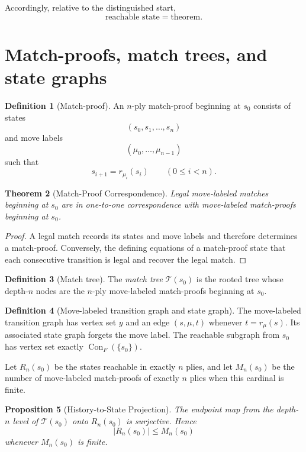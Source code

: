 \documentclass[11pt]{article}
\newtheorem{theorem}{Theorem}[section]
\newtheorem{proposition}[theorem]{Proposition}
\theoremstyle{definition}
\newtheorem{definition}[theorem]{Definition}
\theoremstyle{remark}
\newcommand{\Conseq}{\operatorname{Con}}
\begin{document}
Accordingly, relative to the distinguished start,
\[
\boxed{\text{reachable state}=\text{theorem}.}
\]

\section{Match-proofs, match trees, and state graphs}

\begin{definition}[Match-proof]
An $n$-ply match-proof beginning at $s_0$ consists of states
\[
(s_0,s_1,\ldots,s_n)
\]
and move labels
\[
(\mu_0,\ldots,\mu_{n-1})
\]
such that
\[
s_{i+1}=r_{\mu_i}(s_i)
\qquad(0\le i<n).
\]
\end{definition}

\begin{theorem}[Match-Proof Correspondence]
Legal move-labeled matches beginning at $s_0$ are in one-to-one correspondence with move-labeled match-proofs beginning at $s_0$.
\end{theorem}

\begin{proof}
A legal match records its states and move labels and therefore determines a match-proof.  Conversely, the defining equations of a match-proof state that each consecutive transition is legal and recover the legal match.
\end{proof}

\begin{definition}[Match tree]
The \emph{match tree} $\mathcal T(s_0)$ is the rooted tree whose depth-$n$ nodes are the $n$-ply move-labeled match-proofs beginning at $s_0$.
\end{definition}

\begin{definition}[Move-labeled transition graph and state graph]
The move-labeled transition graph has vertex set $y$ and an edge $(s,\mu,t)$ whenever $t=r_\mu(s)$.  Its associated state graph forgets the move label.  The reachable subgraph from $s_0$ has vertex set exactly $\Conseq_F(\{s_0\})$.
\end{definition}

Let $R_n(s_0)$ be the states reachable in exactly $n$ plies, and let $M_n(s_0)$ be the number of move-labeled match-proofs of exactly $n$ plies when this cardinal is finite.

\begin{proposition}[History-to-State Projection]
The endpoint map from the depth-$n$ level of $\mathcal T(s_0)$ onto $R_n(s_0)$ is surjective.  Hence
\[
\boxed{|R_n(s_0)|\le M_n(s_0)}
\]
whenever $M_n(s_0)$ is finite.
\end{proposition}
\end{document}

